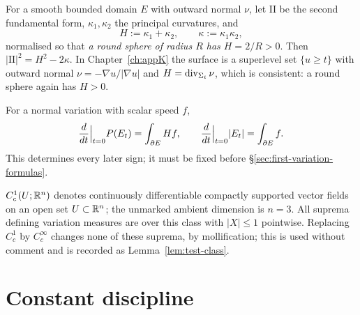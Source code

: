 \begin{convention}\label{conv:curvature}
For a smooth bounded domain $E$ with outward normal $\nu$, let
$\mathrm{II}$ be the second fundamental form, $\kappa_1,\kappa_2$ the
principal curvatures, and
\[
  H:=\kappa_1+\kappa_2,\qquad \kappa:=\kappa_1\kappa_2 ,
\]
normalised so that \emph{a round sphere of radius $R$ has $H=2/R>0$}.  Then
$|\mathrm{II}|^2=H^2-2\kappa$.  In Chapter~\ref{ch:appK} the surface is a
superlevel set $\{u\ge t\}$ with outward normal $\nu=-\nabla u/|\nabla u|$
and $H=\operatorname{div}_{\Sigma_t}\nu$, which is consistent: a round sphere again has
$H>0$.
\end{convention}

\begin{convention}\label{conv:first-variation}
For a normal variation with scalar speed $f$,
\[
  \frac{d}{dt}\Big|_{t=0}P(E_t)=\int_{\partial E}Hf,
  \qquad
  \frac{d}{dt}\Big|_{t=0}|E_t|=\int_{\partial E}f .
\]
This determines every later sign; it must be fixed before
\S\ref{sec:first-variation-formulas}.
\end{convention}

\begin{convention}\label{conv:test-fields}
$C^1_c(U;\mathbb R^n)$ denotes continuously differentiable compactly supported
vector fields on an open set $U\subset\mathbb R^n$; the unmarked ambient dimension
is $n=3$.  All suprema defining variation measures are over this class with
$|X|\le1$ pointwise.  Replacing $C^1_c$ by
$C^\infty_c$ changes none of these suprema, by mollification; this is used
without comment and is recorded as Lemma~\ref{lem:test-class}.
\end{convention}

\section{Constant discipline}

